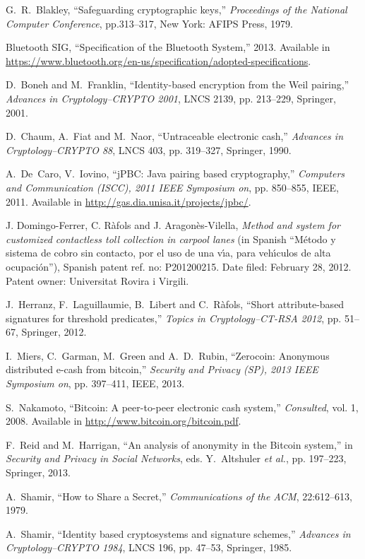 \documentclass[11pt]{llncs}
\begin{document}
\bigskip

\begin{thebibliography}{10}
G.~R.~Blakley,
``Safeguarding cryptographic keys,''
\emph{Proceedings of the National Computer Conference},  pp.313--317, New York: AFIPS Press, 1979.

Bluetooth SIG,
``Specification of the Bluetooth System,''
2013. Available in \url{https://www.bluetooth.org/en-us/specification/adopted-specifications}.

D.~Boneh and M.~Franklin,
``Identity-based encryption from the Weil pairing,''
\emph{Advances in Cryptology--CRYPTO 2001}, LNCS 2139, pp. 213--229, Springer, 2001.

D.~Chaum, A.~Fiat and M.~Naor,
``Untraceable electronic cash,''
\emph{Advances in Cryptology--CRYPTO 88}, LNCS 403, pp. 319--327,
Springer, 1990.

A.~De~Caro, V.~Iovino,
``jPBC: Java pairing based cryptography,''
\emph{Computers and Communication (ISCC), 2011 IEEE Symposium on}, pp. 850--855, IEEE, 2011.
Available in \url{http://gas.dia.unisa.it/projects/jpbc/}.

J. Domingo-Ferrer, C. R\`afols and
J. Aragon\`es-Vilella, {\em Method and system for customized contactless
toll collection in carpool lanes} (in Spanish
``M\'etodo y sistema de cobro sin contacto, por el uso de una v\'{\i}a,
para veh\'{\i}culos de alta ocupaci\'on''),
Spanish patent ref. no: P201200215. Date filed: February 28, 2012.
Patent owner: Universitat Rovira i Virgili.

J.~Herranz, F.~Laguillaumie, B.~Libert and C.~R\`afols,
``Short attribute-based signatures for threshold predicates,''
\emph{Topics in Cryptology--CT-RSA 2012}, pp. 51--67, Springer, 2012.


I.~Miers, C.~Garman, M.~Green and A.~D.~Rubin,
``Zerocoin: Anonymous distributed e-cash from bitcoin,''
\emph{Security and Privacy (SP), 2013 IEEE Symposium on}, pp. 397--411, IEEE, 2013.

S.~Nakamoto,
``Bitcoin: A peer-to-peer electronic cash system,''
\emph{Consulted}, vol. 1, 2008. Available in \url{http://www.bitcoin.org/bitcoin.pdf}.

F.~Reid and M.~Harrigan,
``An analysis of anonymity in the Bitcoin system,''
in \emph{Security and Privacy in Social Networks},
eds. Y.~Altshuler {\em et al.}, pp. 197--223, Springer, 2013.

A.~Shamir,
``How to Share a Secret,''
\emph{Communications of the ACM}, 22:612--613, 1979.

A.~Shamir,
``Identity based cryptosystems and signature schemes,''
\emph{Advances in Cryptology--CRYPTO 1984},
 LNCS 196, pp. 47--53, Springer, 1985.

\end{thebibliography}
\end{document}
